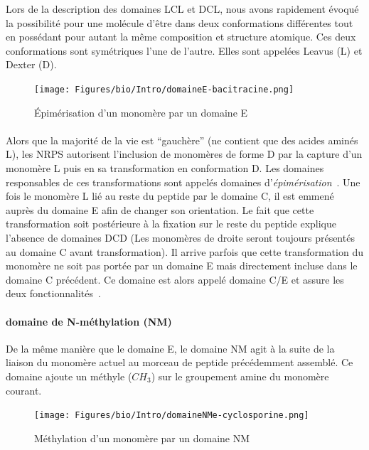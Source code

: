 \documentclass[12pt,french,twoside]{report}
\begin{document}
Lors de la description des domaines LCL et DCL, nous avons rapidement évoqué la possibilité pour une molécule d'être dans deux conformations différentes tout en possédant pour autant la même composition et structure atomique.
Ces deux conformations sont symétriques l'une de l'autre.
Elles sont appelées Leavus (L) et Dexter (D).

\begin{figure}[h!]
  \begin{center}
    \texttt{[image: Figures/bio/Intro/domaineE-bacitracine.png]}
    \caption{\label{domaine_E}Épimérisation d'un monomère par un domaine E}
  \end{center}
\end{figure}

\paragraph{}Alors que la majorité de la vie est ``gauchère'' (ne contient que des acides aminés L), les NRPS autorisent l'inclusion de monomères de forme D par la capture d'un monomère L puis en sa transformation en conformation D.
Les domaines responsables de ces transformations sont appelés domaines d'\textit{épimérisation}~\cite{calcott_portability_2015}.
Une fois le monomère L lié au reste du peptide par le domaine C, il est emmené auprès du domaine E afin de changer son orientation.
Le fait que cette transformation soit postérieure à la fixation sur le reste du peptide explique l'absence de domaines DCD (Les monomères de droite seront toujours présentés au domaine C avant transformation).
Il arrive parfois que cette transformation du monomère ne soit pas portée par un domaine E mais directement incluse dans le domaine C précédent.
Ce domaine est alors appelé domaine C/E et assure les deux fonctionnalités~\cite{yin_enduracidin_2006,balibar_generation_2005}.


\paragraph{domaine de N-méthylation (NM)}

De la même manière que le domaine E, le domaine NM agit à la suite de la liaison du monomère actuel au morceau de peptide précédemment assemblé.
Ce domaine ajoute un méthyle ($CH_{3}$) sur le groupement amine du monomère courant.

\begin{figure}[h!]
  \begin{center}
    \texttt{[image: Figures/bio/Intro/domaineNMe-cyclosporine.png]}
    \caption{\label{domaine_NMe}Méthylation d'un monomère par un domaine NM}
  \end{center}
\end{figure}
\end{document}
